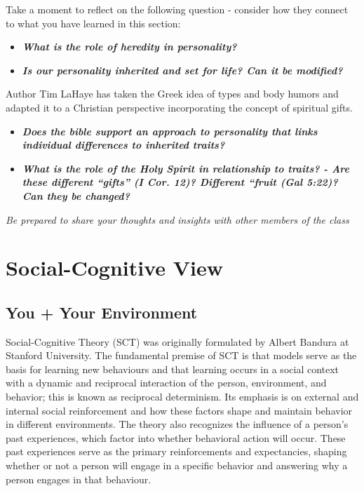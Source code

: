 \documentclass[
]{book}
\providecommand{\tightlist}{%
  \setlength{\itemsep}{0pt}\setlength{\parskip}{0pt}}
\begin{document}
\begin{reflect}
Take a moment to reflect on the following question - consider how they connect to what you have learned in this section:

\begin{itemize}
\tightlist
\item
  \textbf{\emph{What is the role of heredity in personality?}}\\
\item
  \textbf{\emph{Is our personality inherited and set for life? Can it be modified?}}
\end{itemize}

Author Tim LaHaye has taken the Greek idea of types and body humors and adapted it to a Christian perspective incorporating the concept of spiritual gifts.

\begin{itemize}
\tightlist
\item
  \textbf{\emph{Does the bible support an approach to personality that links individual differences to inherited traits?}}\\
\item
  \textbf{\emph{What is the role of the Holy Spirit in relationship to traits? - Are these different ``gifts'' (I Cor. 12)? Different ``fruit (Gal 5:22)? Can they be changed?}}
\end{itemize}

\emph{Be prepared to share your thoughts and insights with other members of the class}
\end{reflect}

\hypertarget{social-cognitive-view}{%
\section{Social-Cognitive View}\label{social-cognitive-view}}

\hypertarget{you-your-environment}{%
\subsection*{You + Your Environment}\label{you-your-environment}}

Social-Cognitive Theory (SCT) was originally formulated by Albert Bandura at Stanford University. The fundamental premise of SCT is that models serve as the basis for learning new behaviours and that learning occurs in a social context with a dynamic and reciprocal interaction of the person, environment, and behavior; this is known as reciprocal determinism. Its emphasis is on external and internal social reinforcement and how these factors shape and maintain behavior in different environments. The theory also recognizes the influence of a person's past experiences, which factor into whether behavioral action will occur. These past experiences serve as the primary reinforcements and expectancies, shaping whether or not a person will engage in a specific behavior and answering why a person engages in that behaviour.
\end{document}
